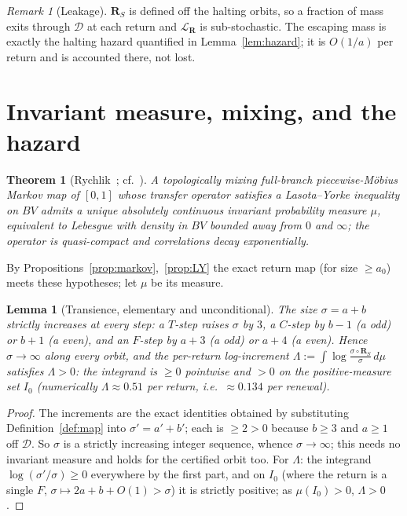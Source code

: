 \documentclass[11pt]{article}
\newtheorem{theorem}{Theorem}\newtheorem{lemma}{Lemma}
\theoremstyle{definition}\newtheorem{definition}{Definition}
\theoremstyle{remark}\newtheorem{remark}{Remark}
\newcommand{\R}{\mathbf{R}}\newcommand{\Z}{\mathbb{Z}}\newcommand{\N}{\mathbb{N}}
\newcommand{\D}{\mathcal D}\newcommand{\Leb}{\mathrm{Leb}}
\begin{document}
\begin{remark}[Leakage]\label{rem:leak}
$\R_S$ is defined off the halting orbits, so a fraction of mass exits through
$\D$ at each return and $\mathcal L_\R$ is sub-stochastic. The escaping mass
is exactly the halting hazard quantified in Lemma~\ref{lem:hazard}; it is
$O(1/a)$ per return and is accounted there, not lost.
\end{remark}

\section{Invariant measure, mixing, and the hazard}
\begin{theorem}[Rychlik~\cite{Rychlik}; cf.\ \cite{AD,Mayer}]\label{thm:acim}
A topologically mixing full-branch piecewise-M\"obius Markov map of $[0,1]$
whose transfer operator satisfies a Lasota--Yorke inequality on $BV$ admits
a unique absolutely continuous invariant probability measure $\mu$,
equivalent to Lebesgue with density in $BV$ bounded away from $0$ and
$\infty$; the operator is quasi-compact and correlations decay
exponentially.
\end{theorem}
By Propositions~\ref{prop:markov},~\ref{prop:LY} the exact return map (for
size $\ge a_0$) meets these hypotheses; let $\mu$ be its measure.

\begin{lemma}[Transience, elementary and unconditional]\label{lem:drift}
The size $\sigma=a+b$ strictly increases at every step: a $T$-step raises
$\sigma$ by $3$, a $C$-step by $b-1$ (a odd) or $b+1$ (a even), and an
$F$-step by $a+3$ (a odd) or $a+4$ (a even). Hence $\sigma\to\infty$ along
\emph{every} orbit, and the per-return log-increment $\Lambda:=\int\log
\frac{\sigma\circ\R_S}{\sigma}\,d\mu$ satisfies $\Lambda>0$: the integrand
is $\ge0$ pointwise and $>0$ on the positive-measure set $I_0$ (numerically
$\Lambda\approx0.51$ per return, i.e.\ $\approx0.134$ per renewal).
\end{lemma}
\begin{proof}
The increments are the exact identities obtained by substituting
Definition~\ref{def:map} into $\sigma'=a'+b'$; each is $\ge2>0$ because
$b\ge3$ and $a\ge1$ off $\D$. So $\sigma$ is a strictly increasing integer
sequence, whence $\sigma\to\infty$; this needs no invariant measure and
holds for the certified orbit too. For $\Lambda$: the integrand
$\log(\sigma'/\sigma)\ge0$ everywhere by the first part, and on $I_0$
(where the return is a single $F$, $\sigma\mapsto2a+b+O(1)>\sigma$) it is
strictly positive; as $\mu(I_0)>0$, $\Lambda>0$.
\end{proof}
\end{document}
